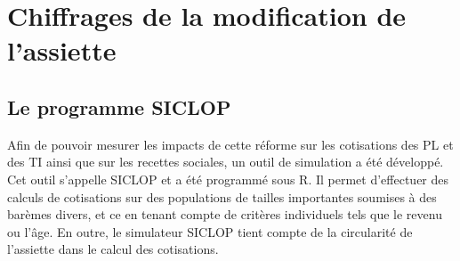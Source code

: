 \section{Chiffrages de la modification de l'assiette}

\subsection{Le programme SICLOP}


Afin de pouvoir mesurer les impacts de cette réforme sur les cotisations des PL et des TI ainsi que sur les recettes sociales, un outil de simulation a été développé.
Cet outil s'appelle SICLOP et a été programmé sous R. Il permet d’effectuer des calculs de cotisations sur des populations de tailles importantes soumises à des barèmes divers, et ce en tenant compte de critères individuels tels que le revenu ou l’âge. En outre, le simulateur SICLOP tient compte de la circularité de l’assiette dans le calcul des cotisations. 

